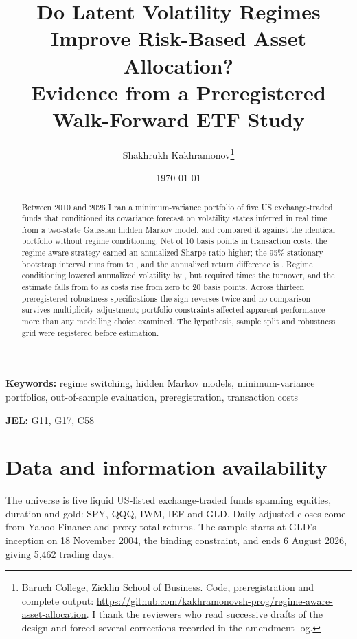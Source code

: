 \documentclass[11pt,letterpaper]{article}
\title{Do Latent Volatility Regimes Improve Risk-Based Asset
Allocation?\\[0.3em]
\large Evidence from a Preregistered Walk-Forward ETF Study}
\author{Shakhrukh Kakhramonov\thanks{Baruch College, Zicklin School of
Business. Code, preregistration and complete output:
\url{https://github.com/kakhramonovsh-prog/regime-aware-asset-allocation}.
I thank the reviewers who read successive drafts of the design and
forced several corrections recorded in the amendment log.}}
\date{\today}
\begin{document}
\maketitle

\begin{abstract}
\noindent
Between 2010 and 2026 I ran a minimum-variance portfolio of five US
exchange-traded funds that conditioned its covariance forecast on
volatility states inferred in real time from a two-state Gaussian hidden
Markov model, and compared it against the identical portfolio without
regime conditioning. Net of 10 basis points in transaction costs, the
regime-aware strategy earned an annualized Sharpe ratio
\primarySharpeDiff{} higher; the 95\% stationary-bootstrap interval runs
from \primaryCiLower{} to \primaryCiUpper{}, and the annualized return
difference is \hacAnnualReturnDiff{}. Regime conditioning lowered
annualized volatility by \volDifferenceMagnitude{}, but required
\turnoverRatio{} times the turnover, and the estimate falls from
\diffAtZeroBps{} to \diffAtTwentyBps{} as costs rise from
zero to 20 basis points. Across thirteen preregistered robustness
specifications the sign reverses twice and no comparison survives
multiplicity adjustment; portfolio constraints affected apparent
performance more than any modelling choice examined. The hypothesis,
sample split and robustness grid were registered before estimation.
\end{abstract}

\vspace{0.5em}
\noindent\textbf{Keywords:} regime switching, hidden Markov models,
minimum-variance portfolios, out-of-sample evaluation, preregistration,
transaction costs

\vspace{0.3em}
\noindent\textbf{JEL:} G11, G17, C58



\section{Data and information availability}
\label{sec:data}

The universe is five liquid US-listed exchange-traded funds spanning
equities, duration and gold: SPY, QQQ, IWM, IEF and GLD. Daily adjusted
closes come from Yahoo Finance and proxy total returns. The sample
starts at GLD's inception on 18 November 2004, the binding constraint,
and ends 6 August 2026, giving 5{,}462 trading days.
\end{document}

